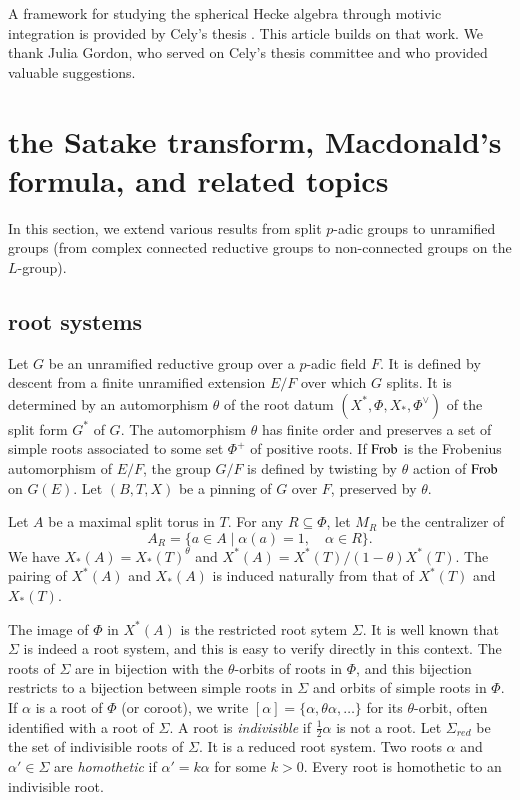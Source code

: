 A framework for studying the spherical Hecke algebra through motivic
integration is provided by Cely's thesis \cite{cely}.  This article
builds on that work.  We thank Julia Gordon, who served on Cely's
thesis committee and who provided valuable suggestions.



\section{the Satake transform, Macdonald's formula, and related topics}

In this section, we extend various results from split $p$-adic groups
to unramified groups (from complex connected reductive groups to
non-connected groups on the $L$-group).

\subsection{root systems}

Let $G$ be an unramified reductive group over a $p$-adic field $F$.
It is defined by descent from a finite unramified extension $E/F$ over
which $G$ splits.  It is determined by an automorphism $\theta$ of the
root datum $(X^*,\Phi,X_*,\Phi^\vee)$ of the split form $G^*$ of $G$.
The automorphism $\theta$ has finite order and preserves a set of
simple roots associated to some set $\Phi^+$ of positive roots.  If
${\operatorname{Frob}}$ is the Frobenius automorphism of $E/F$, the group $G/F$ is
defined by twisting by $\theta$ action of ${\operatorname{Frob}}$ on $G(E)$.  Let
$(B,T,X)$ be a pinning of $G$ over $F$, preserved by $\theta$.

Let $A$ be a maximal split torus in $T$.  For any $R\subseteq \Phi$,
let $M_R$ be the centralizer of
\[
A_R = \{a\in A\mid \alpha(a)=1,\quad \alpha\in R\}.
\]
We have $X_*(A) = X_*(T)^\theta$ and $X^*(A) =
X^*(T)/(1-\theta)X^*(T)$.  The pairing of $X^*(A)$ and $X_*(A)$ is
induced naturally from that of $X^*(T)$ and $X_*(T)$.

The image of $\Phi$ in $X^*(A)$ is the restricted root sytem $\Sigma$.
It is well known that $\Sigma$ is indeed a root system, and this is
easy to verify directly in this context.  The roots of $\Sigma$ are in
bijection with the $\theta$-orbits of roots in $\Phi$, and this
bijection restricts to a bijection between simple roots in $\Sigma$
and orbits of simple roots in $\Phi$.  If $\alpha$ is a root of $\Phi$
(or coroot), we write $[\alpha]=\{\alpha,\theta\alpha,\ldots\}$ for
its $\theta$-orbit, often identified with a root of $\Sigma$.
A root is {\it indivisible} if $\frac12\alpha$ is not a root.
Let $\Sigma_{red}$ be the set of %
indivisible roots of $\Sigma$.  It is a reduced root system.
Two roots $\alpha$ and $\alpha'\in\Sigma$ are {\it homothetic} if
$\alpha' = k\alpha$ for some $k>0$.  Every root is homothetic to an
indivisible root.  %

